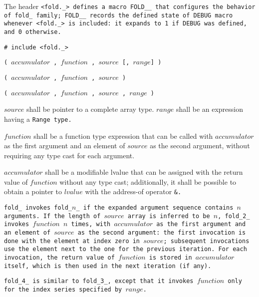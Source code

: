 The header \tt{<fold._>} defines a macro \tt{FOLD__} that configures
the behavior of \tt{fold_} family; \tt{FOLD__} records the \tt{defined}
state of \tt{DEBUG} macro whenever \tt{<fold._>} is included:
it expands to \tt{1} if \tt{DEBUG} was defined, and \tt{0} otherwise.


\tt{# include <fold._>}

\s\s\s\tt{(} $accumulator$ \tt{,}
$function$ \tt{,} $source$ [\tt{,} $range$] \tt{)}

\s\tt{(} $accumulator$ \tt{,}
$function$ \tt{,} $source$ \tt{)}

\s\tt{(} $accumulator$ \tt{,}
$function$ \tt{,} $source$ \phantom{[}\tt{,} $range$\phantom{]} \tt{)}


$source$ shall be pointer to a complete array type.
$range$  shall be an expression having a \tt{Range} type.

$function$ shall be a function type expression that can be called with
$accumulator$ as the first argument and an element of $source$ as the
second argument, without requiring any type cast for each argument.

$accumulator$ shall be a modifiable lvalue that can be assigned with the
return value of $function$ without any type cast; additionally, it shall be
possible to obtain a pointer to $lvalue$ with the address-of operator \tt{&}.

\enlargethispage*{\baselineskip}


\tt{fold_} invokes \tt{fold_}$n$\_ if the
expanded argument sequence contains $n$ arguments.
If the length of $source$ array is inferred to be $n$, \tt{fold_2_}
invokes $function$ $n$ times, with $accumulator$ as the first argument
and an element of $source$ as the second argument: the first invocation
is done with the element at index zero in $source$; subsequent
invocations use the element next to the one for the previous iteration.
For each invocation, the return value of $function$ is stored in
$accumulator$ itself, which is then used in the next iteration (if any).

\tt{fold_4_} is similar to \tt{fold_3_}, except that it invokes
$function$ only for the index series specified by $range$.

\enlargethispage*{\baselineskip}
\pagebreak
